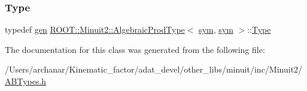 \mbox{\label{classROOT_1_1Minuit2_1_1AlgebraicProdType_3_01sym_00_01sym_01_4_a0b02f8928c35c1a4580a0b80b4ed50a1}} 
\subsubsection{\texorpdfstring{Type}{Type}\hspace{0.1cm}{\footnotesize\ttfamily [2/2]}}
{\footnotesize\ttfamily typedef \mbox{\hyperlink{classROOT_1_1Minuit2_1_1gen}{gen}} \mbox{\hyperlink{classROOT_1_1Minuit2_1_1AlgebraicProdType}{R\+O\+O\+T\+::\+Minuit2\+::\+Algebraic\+Prod\+Type}}$<$ \mbox{\hyperlink{classROOT_1_1Minuit2_1_1sym}{sym}}, \mbox{\hyperlink{classROOT_1_1Minuit2_1_1sym}{sym}} $>$\+::\mbox{\hyperlink{classROOT_1_1Minuit2_1_1AlgebraicProdType_3_01sym_00_01sym_01_4_a0b02f8928c35c1a4580a0b80b4ed50a1}{Type}}}



The documentation for this class was generated from the following file\+:\begin{DoxyCompactItemize}
\item 
/\+Users/archanar/\+Kinematic\+\_\+factor/adat\+\_\+devel/other\+\_\+libs/minuit/inc/\+Minuit2/\mbox{\hyperlink{other__libs_2minuit_2inc_2Minuit2_2ABTypes_8h}{A\+B\+Types.\+h}}\end{DoxyCompactItemize}
